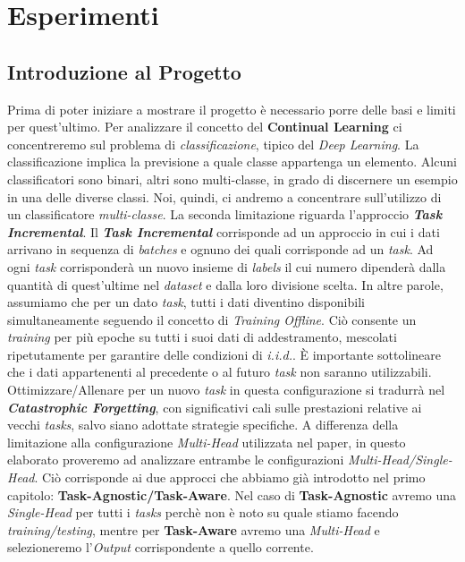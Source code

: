 \chapter{Esperimenti}\label{ch:chapter3}
\section{Introduzione al Progetto}
Prima di poter iniziare a mostrare il progetto è necessario porre delle basi e limiti per quest'ultimo.
Per analizzare il concetto del \textbf{Continual Learning} ci concentreremo sul problema di \textit{classificazione}, tipico del \textit{Deep Learning}. La classificazione implica la previsione a quale classe appartenga un elemento. Alcuni classificatori sono binari, altri sono multi-classe, in grado di discernere un esempio in una delle diverse classi. Noi, quindi, ci andremo a concentrare sull'utilizzo di un classificatore \textit{multi-classe}.
\newline
La seconda limitazione riguarda l'approccio \textbf{\textit{Task Incremental}}.
\newline Il \textbf{\textit{Task Incremental}} corrisponde ad un approccio in cui i dati arrivano in sequenza di \textit{batches} e ognuno dei quali corrisponde ad un \textit{task}. Ad ogni \textit{task} corrisponderà un nuovo insieme di \textit{labels} il cui numero dipenderà dalla quantità di quest'ultime nel \textit{dataset} e dalla loro divisione scelta. In altre parole, assumiamo  che per un dato \textit{task}, tutti i dati diventino disponibili simultaneamente seguendo il concetto di \textit{Training Offline}. Ciò consente un \textit{training} per più epoche su tutti i suoi dati di addestramento, mescolati ripetutamente per garantire delle condizioni di 
\textit{i.i.d.}. È importante sottolineare che i dati appartenenti al  precedente o al futuro \textit{task}
non saranno utilizzabili. Ottimizzare/Allenare per un nuovo \textit{task} in questa configurazione si tradurrà nel \textit{\textbf{Catastrophic Forgetting}}, con significativi
cali sulle prestazioni relative ai vecchi \textit{tasks}, salvo siano adottate strategie specifiche.
\newline 
A differenza della limitazione alla configurazione \textit{Multi-Head} utilizzata nel paper\cite{Continual_Learning},
in questo elaborato proveremo ad analizzare entrambe le configurazioni \textit{Multi-Head/Single-Head}. Ciò corrisponde ai due approcci che abbiamo già introdotto nel primo capitolo: \textbf{Task-Agnostic/Task-Aware}. Nel caso di \textbf{Task-Agnostic} avremo una  \textit{Single-Head} per tutti i \textit{tasks} perchè non è noto su quale stiamo facendo \textit{training/testing}, mentre per \textbf{Task-Aware} avremo una \textit{Multi-Head} e selezioneremo l'\textit{Output} corrispondente a quello corrente.
